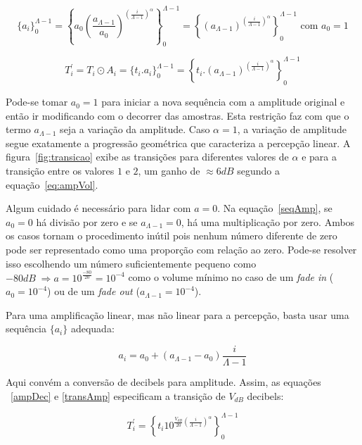 \begin{equation}\label{seqAmp}
\{a_i\}_0^{\Lambda-1}=\left \{ a_0 \left ( \frac{a_{\Lambda-1}}{a_0} \right )^{\left ( \frac{i}{\Lambda-1} \right )^\alpha} \right \}_0^{\Lambda-1}=\left \{ \left ( {a_{\Lambda-1}} \right )^{\left ( \frac{i}{\Lambda-1} \right )^\alpha} \right \}_0^{\Lambda-1} \text{ com } a_0=1
\end{equation}

\begin{equation}\label{transAmp}
T_i^{'}=T_i \odot A_i = \{t_i . a_i\}_0^{\Lambda-1}=\left \{ t_i . (a_{\Lambda-1} )^{\left ( \frac{i}{\Lambda-1} \right )^\alpha} \right \}_0^{\Lambda-1}
\end{equation}

Pode-se tomar $a_0=1$ para iniciar a nova sequência com a amplitude original e então ir modificando com o decorrer das amostras.
Esta restrição faz com que o termo $a_{\Lambda-1}$ seja a variação da amplitude.
Caso $\alpha=1$, a variação de amplitude segue exatamente a progressão geométrica que caracteriza
a percepção linear. A figura~\ref{fig:transicao} exibe as transições para diferentes valores de $\alpha$ e para a transição entre os valores $1$ e $2$, um ganho de $\approx 6dB$ segundo a equação~\ref{eq:ampVol}.


Algum cuidado é necessário para lidar com $a=0$.
Na equação~\ref{seqAmp}, se $a_0=0$ há divisão por zero e
se $a_{\Lambda-1}=0$, há uma multiplicação por zero. Ambos os casos
tornam o procedimento inútil pois nenhum número diferente de zero pode ser representado como uma proporção com relação ao zero. Pode-se resolver isso escolhendo um número suficientemente pequeno como $-80dB\;\Rightarrow a=10^{\frac{-80}{20}}=10^{-4}$ como o volume mínimo no caso de um
\emph{fade in} ($a_0=10^{-4}$) ou de um \emph{fade out} ($a_{\Lambda-1}=10^{-4}$).


Para uma amplificação linear, mas não linear para a percepção, basta usar uma sequência $\{a_i\}$ adequada:

\begin{equation}\label{seqAmpLin}
a_i=a_0 + (a_{\Lambda-1}-a_0)\frac{i}{\Lambda-1}
\end{equation}

Aqui convém a conversão de decibels para amplitude. Assim, as equações ~\ref{ampDec} e \ref{transAmp}
especificam a transição de $V_{dB}$ decibels:

\begin{equation}\label{seqAmpDB}
T_i^{'}=\left\{ t_i 10^{\frac{V_{dB}}{20}\left( \frac{i}{\Lambda-1} \right)^\alpha} \right\}_0^{\Lambda-1}
\end{equation}

